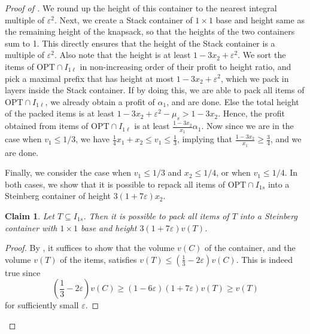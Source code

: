 \documentclass[10pt,a4paper]{amsart}
\renewcommand{\epsilon}{\varepsilon} %
\newtheorem{claim}[theorem]{Claim}
\theoremstyle{definition}
\begin{document}
\begin{proof}[Proof of ]
    We round up the height of this container to the nearest integral multiple of $\epsilon^2$. Next, we create a Stack container of $1\times 1$ base and height same as the remaining height of the knapsack, so that the heights of the two containers sum to 1. This directly ensures that the height of the Stack container is a multiple of $\epsilon^2$. Also note that the height is at least $1-3x_2 + \epsilon^2$. We sort the items of $\text{OPT}\cap I_{1\ell}$ in non-increasing order of their profit to height ratio, and pick a maximal prefix that has height at most $1-3x_2+\epsilon^2$, which we pack in layers inside the Stack container. If by doing this, we are able to pack all items of $\text{OPT}\cap I_{1\ell}$, we already obtain a profit of $\alpha_1$, and are done. Else the total height of the packed items is at least $1-3x_2+\epsilon^2-\mu_s > 1-3x_2$. Hence, the profit obtained from items of $\text{OPT}\cap I_{1\ell}$ is at least $\frac{1-3x_2}{x_1}\alpha_1$. Now since we are in the case when $v_1 \le 1/3$, we have $\frac{1}{4}x_1+x_2\le v_1\le \frac{1}{3}$, implying that $\frac{1-3x_2}{x_1}\ge \frac{3}{4}$, and we are done.
    
    
    
    
    

    Finally, we consider the case when $v_1\le 1/3$ and $x_2\le 1/4$, or when $v_1\le 1/4$. In both cases, we show that it is possible to repack all items of $\text{OPT}\cap I_{1s}$ into a Steinberg container of height $3(1+7\epsilon)x_2$. 
    
    \begin{claim}
    \label{cla:steinberg}
        Let $T\subseteq I_{1s}$. Then it is possible to pack all items of $T$ into a Steinberg container with $1\times 1$ base and height $3(1+7\epsilon)v(T)$.
    \end{claim}
    \begin{proof}
        By , it suffices to show that the volume $v(C)$ of the container, and the volume $v(T)$ of the items, satisfies $v(T) \le \left(\frac{1}{3}-2\epsilon\right)v(C)$. This is indeed true since
        \[ \left(\frac{1}{3}-2\epsilon\right)v(C) \ge (1-6\epsilon)(1+7\epsilon)v(T) \ge v(T)\]
        for sufficiently small $\epsilon$.
    \end{proof}
    

\end{proof}
\end{document}
